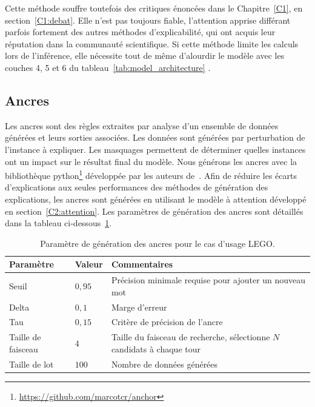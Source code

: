 Cette méthode souffre toutefois des critiques énoncées dans le Chapitre~\ref{C1}, en section~\ref{C1:debat}. Elle n'est pas toujours fiable, l'attention apprise différant parfois fortement des autres méthodes d'explicabilité, qui ont acquis leur réputation dans la communauté scientifique. Si cette méthode limite les calculs lors de l'inférence, elle nécessite tout de même d'alourdir le modèle avec les couches 4, 5 et 6 du tableau~\ref{tab:model_architecture} .


\subsection{Ancres}

Les ancres sont des règles extraites par analyse d'un ensemble de données générées et leurs sorties associées. Les données sont générées par perturbation de l'instance à expliquer. Les masquages permettent de déterminer quelles instances ont un impact sur le résultat final du modèle.
Nous générons les ancres avec la bibliothèque python\footnote{\url{https://github.com/marcotcr/anchor}} développée par les auteurs de~\cite{Ribeiro2018}. Afin de réduire les écarts d'explications aux seules performances des méthodes de génération des explications, les ancres sont générées en utilisant le modèle à attention développé en section~\ref{C2:attention}. Les paramètres de génération des ancres sont détaillés dans la tableau ci-dessous~\ref{tab:ancres_params}.

\begin{table}[htb!p]
\caption{Paramètre de génération des ancres pour le cas d'usage LEGO.}\label{tab:ancres_params}
\begin{tabular}{|p{}|p{}|p{}|}
\hline
\textbf{Paramètre} & \textbf{Valeur} & \textbf{Commentaires} \\ \hline
Seuil              & $0,95$ & Précision minimale requise pour ajouter un nouveau mot \\ \hline
Delta              & $0,1$  & Marge d'erreur  \\ \hline
Tau                & $0,15$ & Critère de précision de l'ancre\\ \hline
Taille de faisceau & $4$ & Taille du faisceau de recherche, sélectionne $N$ candidats à chaque tour\\ \hline
Taille de lot      & $100$  & Nombre de données générées  \\ \hline %
\end{tabular}
\end{table}

